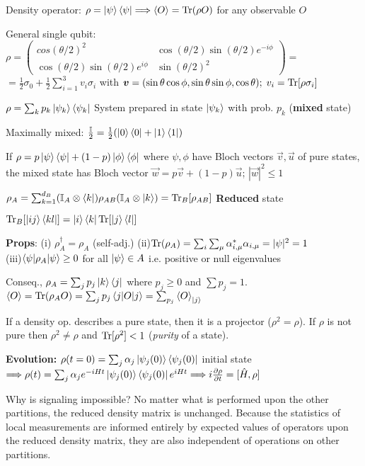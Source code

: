 \begin{squishlist}
    \item Density operator: $\rho = \ket{\psi} \bra{\psi} \Longrightarrow \braket{O} = \mathrm{Tr} (\rho O)$ for any observable $O$
\item General single qubit: $\rho = \begin{pmatrix} cos(\theta/2)^2 & \cos(\theta/2)\sin(\theta/2)e^{-i\phi} \\ \cos(\theta/2)\sin(\theta/2)e^{i\phi} & \sin(\theta/2)^2 \end{pmatrix} = $ \\
$= \frac{1}{2}\sigma_0 + \frac{1}{2}\sum_{i=1}^3 v_i \sigma_i$ with $\mbox{\boldmath$v$} = (\sin\theta \cos\phi , \sin\theta\sin\phi, \cos\theta);\; v_i = \mathrm{Tr}[\rho \sigma_i]$
\item $\rho = \sum_k p_k \ket{\psi_k}\bra{\psi_k}$ System prepared in state $\ket{\psi_k}$ with prob. $p_k$ (\textbf{mixed} state)
\item Maximally mixed: $\frac{\mathbb{I}}{2} = \frac{1}{2} (\ket{0}\bra{0} + \ket{1}\bra{1})$
\item If $\rho = p \ket{\psi}\bra{\psi} + (1-p) \ket{\phi}\bra{\phi}$ where
$\psi, \phi$ have Bloch vectors $\vec{v}, \vec{u}$ of pure states, the mixed state has Bloch vector $\vec{w} = p \vec{v} + (1-p) \vec{u}$; $|\vec{w}|^2 \leq 1$
\item $\rho_A = \sum_{k=1}^{d_B}(\mathbb{I}_A \otimes \bra{k})\rho_{AB}(\mathbb{I}_A \otimes \ket{k}) = \mathrm{Tr}_B[\rho_{AB}]$ \quad \textbf{Reduced} state
\item $\mathrm{Tr}_B[\ket{ij}\bra{kl}] = \ket{i}\bra{k} \mathrm{Tr}[\ket{j}\bra{l}]$
\item \textbf{Props}: 
(i) $\rho_A^{\dagger} = \rho_A$ (self-adj.) \qquad (ii)$\mathrm{Tr}(\rho_A) = \sum_i  \sum_{\mu}\alpha^*_{i,\mu}\alpha_{i,\mu} = |\psi|^2 = 1$ \\ (iii)$\braket{\psi|\rho_A|\psi} \geq 0$ for all $\ket{\psi} \in A$ i.e. positive or null eigenvalues
\item Conseq., $\rho_A = \sum_j p_j \ket{k}\bra{j}$ where $p_j\geq 0$ and $\sum p_j = 1$.\\ $\braket{O} = \mathrm{Tr}(\rho_A O) = \sum_j p_j \braket{j|O|j} = \sum_{p_j} \braket{O}_{\ket{j}}$
\item If a density op. describes a pure state, then it is a projector ($\rho^2 = \rho$). If $\rho$ is not pure then $\rho^2 \neq \rho$ and $\mathrm{Tr}[\rho^2] < 1$ (\emph{purity} of a state).
\item \textbf{Evolution:} $\rho(t=0) = \sum_j \alpha_j \ket{\psi_j(0)}\bra{\psi_j(0)}$ initial state \\ $\Longrightarrow \rho(t) = \sum_j \alpha_j e^{-iHt} \ket{\psi_j(0)}\bra{\psi_j(0)}e^{iHt} \Longrightarrow i \frac{\partial \rho}{\partial t} = [\hat{H},\rho]$
\item Why is signaling impossible? No matter what is performed upon the other partitions, the reduced density matrix is unchanged. Because the statistics of local measurements are informed entirely by expected values of operators upon the reduced density matrix, they are also independent of operations on other partitions.
\end{squishlist}

